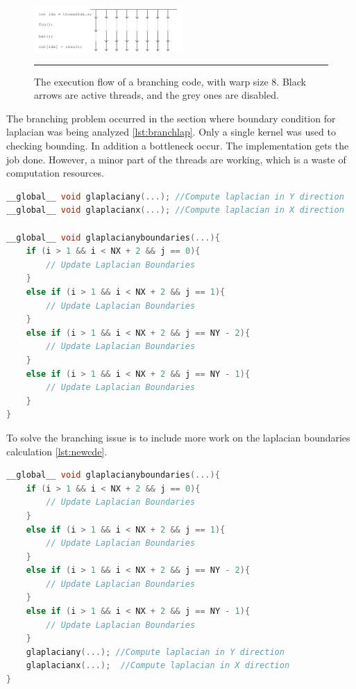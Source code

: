 \begin{figure}[htbp]
	\centering
		\includegraphics[width=0.51\textwidth]{Figures/threads.png}
		\rule{35em}{0.2pt}
	\caption[he execution flow]{The execution flow of a branching code, with warp size 8. Black arrows are active threads, and the grey ones are disabled.}
	\label{fig:threads}
\end{figure}

The branching problem occurred in the section where boundary condition for laplacian was being analyzed \ref{lst:branchlap}. Only a single kernel was used to checking bounding. In addition a bottleneck occur. The implementation gets the job done. However, a minor part of the threads are working, which is a waste of computation resources.

\begin{lstlisting}[language=C++, label={lst:branchlap}, caption={Branching problem in the laplacian boundary condition evaluation}]
__global__ void glaplaciany(...); //Compute laplacian in Y direction
__global__ void glaplacianx(...); //Compute laplacian in X direction

__global__ void glaplacianyboundaries(...){
    if (i > 1 && i < NX + 2 && j == 0){
     	// Update Laplacian Boundaries
    }
    else if (i > 1 && i < NX + 2 && j == 1){
  		// Update Laplacian Boundaries
  	}
    else if (i > 1 && i < NX + 2 && j == NY - 2){
        // Update Laplacian Boundaries
    }
    else if (i > 1 && i < NX + 2 && j == NY - 1){
        // Update Laplacian Boundaries
    }
}
\end{lstlisting}

To solve the branching issue is to include more work on the laplacian boundaries calculation \ref{lst:newcde}.
\begin{lstlisting}[language=C++, label={lst:newcde}, caption={More workload on a single kernel execution}]
__global__ void glaplacianyboundaries(...){
    if (i > 1 && i < NX + 2 && j == 0){
     	// Update Laplacian Boundaries
    }
    else if (i > 1 && i < NX + 2 && j == 1){
  		// Update Laplacian Boundaries
    }
    else if (i > 1 && i < NX + 2 && j == NY - 2){
        // Update Laplacian Boundaries
    }
    else if (i > 1 && i < NX + 2 && j == NY - 1){
        // Update Laplacian Boundaries
    }
    glaplaciany(...); //Compute laplacian in Y direction
	glaplacianx(...);  //Compute laplacian in X direction
}
\end{lstlisting}


